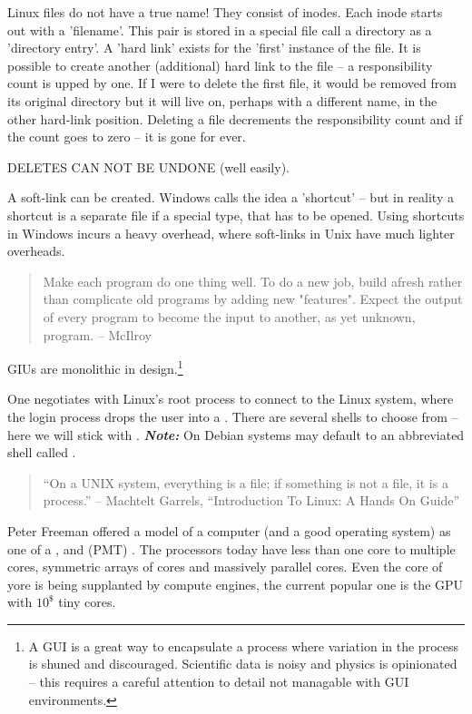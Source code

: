 Linux files do not have a true name! They consist of inodes. Each inode
starts out with a 'filename'. This pair is stored in a special file
call a directory as a 'directory entry'. A 'hard link' exists
for the 'first' instance of the file. It is possible to create
another (additional) hard link to the file -- a responsibility
count is upped by one. If I were to delete the first file, it
would be removed from its original directory but it will live
on, perhaps with a different name, in the other hard-link position.
Deleting a file decrements the responsibility count and if the
count goes to zero -- it is gone for ever.

DELETES CAN NOT BE UNDONE (well easily).

A soft-link can be created. Windows calls the idea a 'shortcut' -- but
in reality a shortcut is a separate file if a special type, that has to
be opened. Using shortcuts in Windows incurs a heavy overhead, where
soft-links in Unix have much lighter overheads.

\begin{quote}
    Make each program do one thing well. To do a new job, build afresh
    rather than complicate old programs by adding new "features". Expect
    the output of every program to become the input to another, as yet
    unknown, program. -- McIlroy
\end{quote}

GIUs are monolithic in design.\footnote{A GUI is a great way to encapsulate
a process where variation in the process is shuned and discouraged. Scientific
data is noisy and physics is opinionated -- this requires a careful attention
to detail not managable with GUI environments.}

One negotiates with Linux's root process to connect to the Linux
system, where the login process drops the user into a
. There are several shells to choose from -- here we will
stick with  . \textbf{\emph{Note:}} On Debian
systems  may default to an abbreviated shell called
. 

\begin{quote}
``On a UNIX system, everything is a file; if something is not a file, it is a process.'' --
Machtelt Garrels, ``Introduction To Linux: A Hands On Guide''
\end{quote}

Peter Freeman \cite{freeman1975software} offered a model of a computer
(and a good operating system) as one of a ,
 and  (PMT) . The
processors today have less than one core to multiple cores, symmetric
arrays of cores and massively parallel cores.  Even the core of yore
is being supplanted by compute engines, the current popular one is the
GPU with $10^{\$}$ tiny cores.

